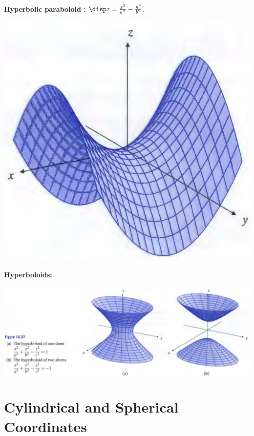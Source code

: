 \begin{spacing}{1.3}
    {\bf Hyperbolic paraboloid :} $\disp z=\frac{x^2}{a^2}-\frac{y^2}{b^2}$.

    \begin{center}
        \includegraphics[scale=0.3]{images/Ch10-hyperbolic-paraboloid.png}
    \end{center}

    {\bf Hyperboloids:}
    \begin{center}
        \includegraphics[scale=0.37]{images/Ch10-hyperboloid.png}
    \end{center}

    \section{Cylindrical and Spherical Coordinates}


\end{spacing}
